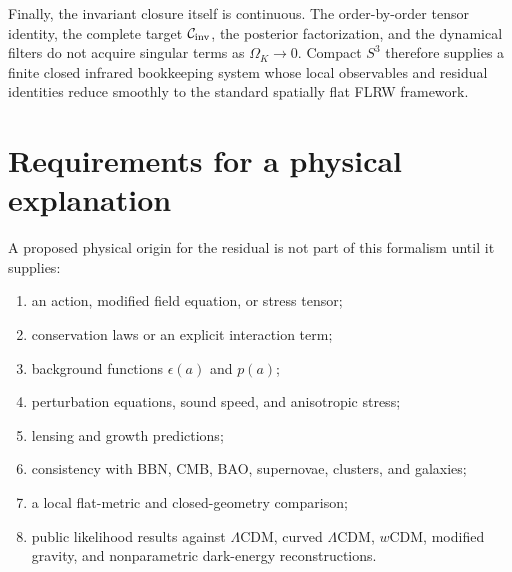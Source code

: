 \documentclass[
  aps,
  prd,
  reprint,
  superscriptaddress,
  nofootinbib,
  floatfix,
  longbibliography
]{revtex4-2}
\theoremstyle{plain}
\theoremstyle{definition}
\theoremstyle{remark}
\begin{document}
Finally, the invariant closure itself is continuous.  The order-by-order tensor
identity, the complete target $\mathcal C_{\rm inv}$, the posterior
factorization, and the dynamical filters do not acquire singular terms as
$\Omega_K\to0$.  Compact $S^3$ therefore supplies a finite closed infrared
bookkeeping system whose local observables and residual identities reduce
smoothly to the standard spatially flat FLRW framework.

\section{Requirements for a physical explanation}

A proposed physical origin for the residual is not part of this formalism until
it supplies:
\begin{enumerate}
\item an action, modified field equation, or stress tensor;
\item conservation laws or an explicit interaction term;
\item background functions $\epsilon(a)$ and $p(a)$;
\item perturbation equations, sound speed, and anisotropic stress;
\item lensing and growth predictions;
\item consistency with BBN, CMB, BAO, supernovae, clusters, and galaxies;
\item a local flat-metric and closed-geometry comparison;
\item public likelihood results against $\Lambda$CDM, curved $\Lambda$CDM,
$w$CDM, modified gravity, and nonparametric dark-energy reconstructions.
\end{enumerate}
\end{document}
